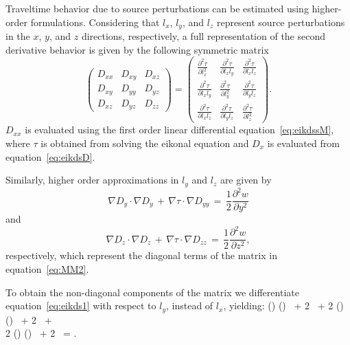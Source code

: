 Traveltime  behavior due to source perturbations can be
 estimated  using higher-order
formulations. Considering that $l_x$, $l_y$, and $l_z$ represent
source perturbations in the $x$, $y$, and $z$ directions,
respectively, a full representation of the second derivative behavior
is given by the following symmetric matrix
\begin{equation}
\left(
\begin{array}{ccc}
D_{xx}  & D_{xy} & D_{xz} \\
D_{xy} & D_{yy} & D_{yz} \\
D_{xz} & D_{yz} & D_{zz}
\end{array}
\right) = 
\left(
\begin{array}{ccc}
\frac{\partial^2 \tau}{\partial l_x^2}
  & \frac{\partial^2 \tau}{\partial l_x l_y} & \frac{\partial^2 \tau}{\partial l_x l_z} \\
\frac{\partial^2 \tau}{\partial l_x l_y} & \frac{\partial^2 \tau}{\partial l_y^2} & \frac{\partial^2 \tau}{\partial l_y l_z} \\
\frac{\partial^2 \tau}{\partial l_x l_z} & \frac{\partial^2 \tau}{\partial l_y l_z} & \frac{\partial^2 \tau}{\partial l_z^2}
\end{array}
\right).
\label{eq:MM2}
\end{equation}
$D_{xx}$ is evaluated using the first order linear differential
equation~\ref{eq:eikdssM}, where $\tau$ is obtained from solving the
eikonal equation and $D_x$ is evaluated from equation~\ref{eq:eikdsD}.

Similarly, higher order approximations in $l_y$ and $l_z$ are given by
\begin{equation}
\nabla D_y \cdot \nabla D_y \, + \,\nabla \tau \cdot \nabla D_{yy} \, = \, \frac{1}{2} \frac{\partial^2 w}{\partial y^2}
\label{eq:eikdy}
\end{equation}
and
\begin{equation}
\nabla D_z \cdot \nabla D_z \, + \,\nabla \tau \cdot \nabla D_{zz} \, = \, \frac{1}{2} \frac{\partial^2 w}{\partial z^2},
\label{eq:eikdz}
\end{equation}
respectively, which represent the diagonal terms of the matrix in
equation~\ref{eq:MM2}.

To obtain the non-diagonal components of the matrix we differentiate
equation~\ref{eq:eikds1} with respect to $l_y$, instead of $l_x$,
yielding:  \left(\right) \left(\right) \, + 2  \,
 + 2
\left(\right)
\left(\right) \, +
2  \, + \nonumber \\
2 \left(\right)
\left(\right) \, + 2
 \,  = .
\label{eq:eikdsd2l}
\eea


